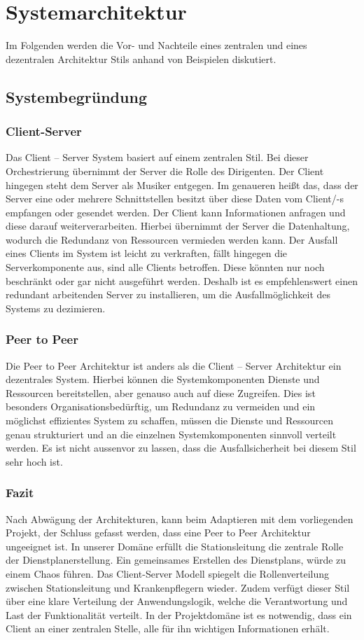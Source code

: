 \documentclass[10pt,a4paper]{article}
\begin{document}
\section{Systemarchitektur}
Im Folgenden werden die Vor- und Nachteile eines zentralen und eines dezentralen Architektur Stils anhand von Beispielen diskutiert.
\subsection{Systembegründung}
\subsubsection{Client-Server}
Das Client – Server System basiert auf einem zentralen Stil. Bei dieser Orchestrierung übernimmt der Server die Rolle des Dirigenten. Der Client hingegen steht dem Server als Musiker entgegen. Im genaueren heißt das, dass der Server eine oder mehrere Schnittstellen besitzt über diese Daten vom Client/-s empfangen oder gesendet werden. Der Client kann Informationen anfragen und diese darauf weiterverarbeiten. Hierbei übernimmt der Server die Datenhaltung, wodurch die Redundanz von Ressourcen vermieden werden kann. Der Ausfall eines Clients im System ist leicht zu verkraften, fällt hingegen die Serverkomponente aus, sind alle Clients betroffen. Diese könnten nur noch beschränkt oder gar nicht ausgeführt werden. Deshalb ist es empfehlenswert einen redundant arbeitenden Server zu installieren, um die Ausfallmöglichkeit des Systems zu dezimieren.
\subsubsection{Peer to Peer}
Die Peer to Peer Architektur ist anders als die Client – Server Architektur ein dezentrales System. Hierbei können die Systemkomponenten Dienste und Ressourcen bereitstellen, aber genauso auch auf diese Zugreifen. Dies ist besonders Organisationsbedürftig, um Redundanz zu vermeiden und ein möglichst effizientes System zu schaffen, müssen die Dienste und Ressourcen genau strukturiert und an die einzelnen Systemkomponenten sinnvoll verteilt werden. Es ist nicht aussenvor zu lassen, dass die Ausfallsicherheit bei diesem Stil sehr hoch ist.
\subsubsection{Fazit}
Nach Abwägung der Architekturen, kann beim Adaptieren mit dem vorliegenden Projekt, der Schluss gefasst werden, dass eine Peer to Peer Architektur ungeeignet ist. In unserer Domäne erfüllt die Stationsleitung die zentrale Rolle der Dienstplanerstellung. Ein gemeinsames Erstellen des Dienstplans, würde zu einem Chaos führen. Das Client-Server Modell spiegelt die Rollenverteilung zwischen Stationsleitung und Krankenpflegern wieder. Zudem verfügt dieser Stil über eine klare Verteilung der Anwendungslogik, welche die Verantwortung und Last der Funktionalität verteilt. In der Projektdomäne ist es notwendig, dass ein Client an einer zentralen Stelle, alle für ihn wichtigen Informationen erhält.
\end{document}
